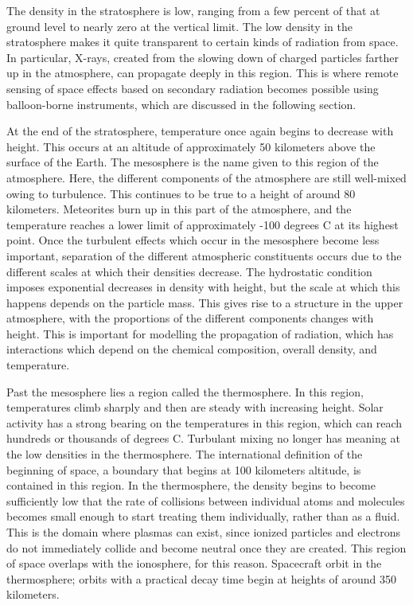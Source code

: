 The density in the stratosphere is low, ranging from a few percent of that at ground level to nearly zero at the vertical limit. The low density in the stratosphere makes it quite transparent to certain kinds of radiation from space. In particular, X-rays, created from the slowing down of charged particles farther up in the atmosphere, can propagate deeply in this region. This is where remote sensing of space effects based on secondary radiation becomes possible using balloon-borne instruments, which are discussed in the following section. 

At the end of the stratosphere, temperature once again begins to decrease with height. This occurs at an altitude of approximately 50 kilometers above the surface of the Earth. The mesosphere is the name given to this region of the atmosphere. Here, the different components of the atmosphere are still well-mixed owing to turbulence. This continues to be true to a height of around 80 kilometers. Meteorites burn up in this part of the atmosphere, and the temperature reaches a lower limit of approximately -100 degrees C at its highest point. Once the turbulent effects which occur in the mesosphere become less important, separation of the different atmospheric constituents occurs due to the different scales at which their densities decrease. The hydrostatic condition imposes exponential decreases in density with height, but the scale at which this happens depends on the particle mass. This gives rise to a structure in the upper atmosphere, with the proportions of the different components changes with height. This is important for modelling the propagation of  radiation, which has interactions which depend on the chemical composition, overall density, and temperature. 

Past the mesosphere lies a region called the thermosphere. In this region, temperatures climb sharply and then are steady with increasing height. Solar activity has a strong bearing on the temperatures in this region, which can reach hundreds or thousands of degrees C. Turbulant mixing no longer has meaning at the low densities in the thermosphere. The international definition of the beginning of space, a boundary that begins at 100 kilometers altitude, is contained in this region. In the thermosphere, the density begins to become sufficiently low that the rate of collisions between individual atoms and molecules becomes small enough to start treating them individually, rather than as a fluid. This is the domain where plasmas can exist, since ionized particles and electrons do not immediately collide and become neutral once they are created. This region of space overlaps with the ionosphere, for this reason.  Spacecraft orbit in the thermosphere; orbits with a practical decay time begin at heights of around 350 kilometers.

